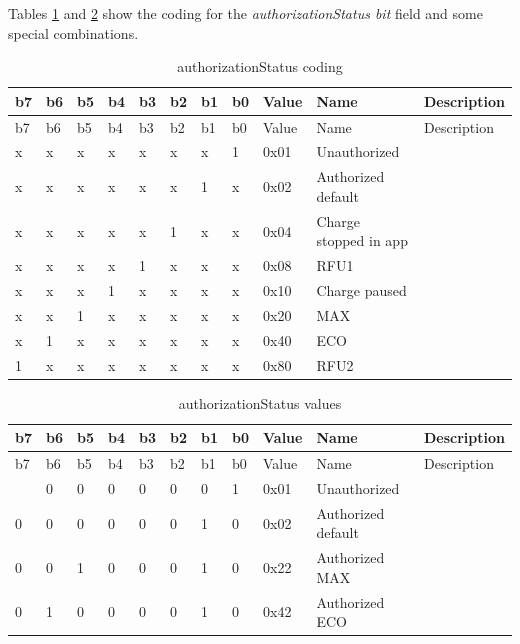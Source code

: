 \documentclass[a4paper]{article}
\begin{document}
Tables \ref{table.51} and \ref{table.52} show the coding for the \emph{authorizationStatus bit} 
field and some special combinations.

\begin{longtable}[]{@{}lllllllllll@{}}
	\caption{authorizationStatus coding}
	\label{table.51}
	\tabularnewline
	\toprule\noalign{}
	b7 & b6 & b5 & b4 & b3 & b2 & b1 & b0 & Value & Name                  & Description \\
	\midrule\noalign{}
	\endfirsthead
	\toprule\noalign{}
	b7 & b6 & b5 & b4 & b3 & b2 & b1 & b0 & Value & Name                  & Description \\
	\midrule\noalign{}
	\endhead
	\bottomrule\noalign{}
	\endlastfoot
	x  & x  & x  & x  & x  & x  & x  & 1  & 0x01  & Unauthorized          &             \\
	x  & x  & x  & x  & x  & x  & 1  & x  & 0x02  & Authorized default    &             \\
	x  & x  & x  & x  & x  & 1  & x  & x  & 0x04  & Charge stopped in app &             \\
	x  & x  & x  & x  & 1  & x  & x  & x  & 0x08  & RFU1                  &             \\
	x  & x  & x  & 1  & x  & x  & x  & x  & 0x10  & Charge paused         &             \\
	x  & x  & 1  & x  & x  & x  & x  & x  & 0x20  & MAX                   &             \\
	x  & 1  & x  & x  & x  & x  & x  & x  & 0x40  & ECO                   &             \\
	1  & x  & x  & x  & x  & x  & x  & x  & 0x80  & RFU2                  &             \\
\end{longtable}
\hfill\break

\begin{longtable}[]{@{}lllllllllll@{}}
	\caption{authorizationStatus values}
	\label{table.52}
	\tabularnewline
	\toprule\noalign{}
	b7 & b6 & b5 & b4 & b3 & b2 & b1 & b0 & Value & Name               & Description \\
	\midrule\noalign{}
	\endfirsthead
	\toprule\noalign{}
	b7 & b6 & b5 & b4 & b3 & b2 & b1 & b0 & Value & Name               & Description \\
	\midrule\noalign{}
	\endhead
	\bottomrule\noalign{}
	\endlastfoot
	0  & 0  & 0  & 0  & 0  & 0  & 0  & 1  & 0x01  & Unauthorized       &             \\
	0  & 0  & 0  & 0  & 0  & 0  & 1  & 0  & 0x02  & Authorized default &             \\
	0  & 0  & 1  & 0  & 0  & 0  & 1  & 0  & 0x22  & Authorized MAX     &             \\
	0  & 1  & 0  & 0  & 0  & 0  & 1  & 0  & 0x42  & Authorized ECO     &             \\
\end{longtable}
\hfill\break
\end{document}
